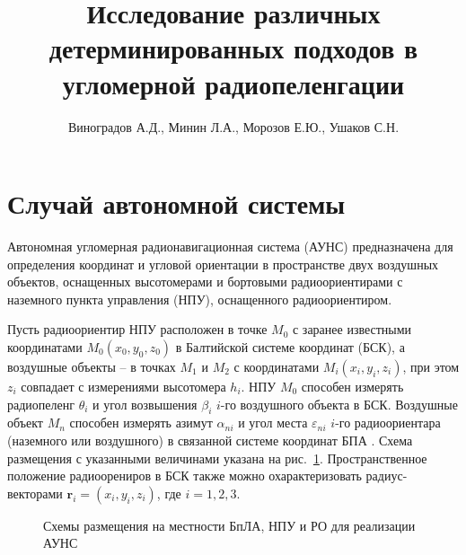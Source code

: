 \documentclass[a4paper,12pt]{article}
\author{Виноградов А.Д., Минин Л.А., Морозов Е.Ю., Ушаков С.Н.}
\title{Исследование различных детерминированных подходов в угломерной радиопеленгации}
\date{}
\begin{document}
\maketitle

\section{Случай автономной системы}
Автономная угломерная радионавигационная система (АУНС) предназначена для определения
координат и угловой ориентации в пространстве двух воздушных объектов, оснащенных
высотомерами и бортовыми радиоориентирами с наземного пункта управления (НПУ),
оснащенного радиоориентиром.

Пусть радиоориентир НПУ расположен в точке $M_0$ с заранее известными координатами
$M_0\left(x_0, y_0, z_0\right)$ в Балтийской системе координат (БСК), а воздушные объекты
-- в точках $M_1$ и $M_2$ с координатами $M_i\left(x_i, y_i, z_i\right)$, при этом $z_i$
совпадает с измерениями высотомера $h_i$. НПУ $M_0$ способен измерять радиопеленг $\theta_i$
и угол возвышения $\beta_i$ $i$-го воздушного объекта в БСК. Воздушные объект $M_n$
способен измерять азимут $\alpha_{ni}$ и угол места $\varepsilon_{ni}$ $i$-го
радиоориентара (наземного или воздушного) в связанной системе координат БПА \cite{antennas}.
Схема размещения с указанными величинами указана на рис.~\ref{figure:pic3}.
Пространственное положение радиоорениров в БСК также можно охарактеризовать радиус-векторами
$\mathbf{r}_i = \left(x_i, y_i, z_i\right)$, где $i = 1,2,3$.

\begin{figure}[htbp]
    \begin{center}


    \caption{Схемы размещения на местности БпЛА, НПУ и РО для реализации АУНС}
    \label{figure:pic3}
    \end{center}
\end{figure}
\end{document}
